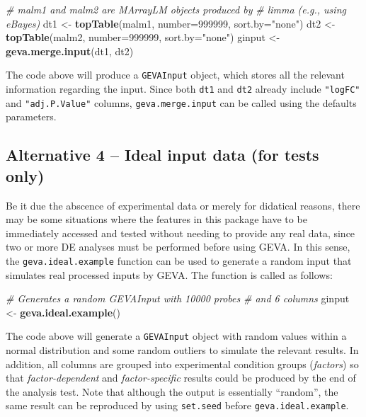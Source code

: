 \documentclass[
  12pt,
]{article}
\newenvironment{Shaded}{\begin{snugshade}}{\end{snugshade}}
\newcommand{\CommentTok}[1]{\textcolor[rgb]{0.56,0.35,0.01}{\textit{#1}}}
\newcommand{\DataTypeTok}[1]{\textcolor[rgb]{0.13,0.29,0.53}{#1}}
\newcommand{\DecValTok}[1]{\textcolor[rgb]{0.00,0.00,0.81}{#1}}
\newcommand{\KeywordTok}[1]{\textcolor[rgb]{0.13,0.29,0.53}{\textbf{#1}}}
\newcommand{\NormalTok}[1]{#1}
\newcommand{\StringTok}[1]{\textcolor[rgb]{0.31,0.60,0.02}{#1}}
\begin{document}
\begin{Shaded}
\begin{Highlighting}[]
\CommentTok{# malm1 and malm2 are MArrayLM objects produced by}
\CommentTok{# limma (e.g., using eBayes)}
\NormalTok{dt1 <-}\StringTok{ }\KeywordTok{topTable}\NormalTok{(malm1, }\DataTypeTok{number=}\DecValTok{999999}\NormalTok{, }\DataTypeTok{sort.by=}\StringTok{"none"}\NormalTok{)}
\NormalTok{dt2 <-}\StringTok{ }\KeywordTok{topTable}\NormalTok{(malm2, }\DataTypeTok{number=}\DecValTok{999999}\NormalTok{, }\DataTypeTok{sort.by=}\StringTok{"none"}\NormalTok{)}
\NormalTok{ginput <-}\StringTok{ }\KeywordTok{geva.merge.input}\NormalTok{(dt1, dt2)}
\end{Highlighting}
\end{Shaded}

The code above will produce a \texttt{GEVAInput} object, which stores
all the relevant information regarding the input. Since both
\texttt{dt1} and \texttt{dt2} already include \texttt{"logFC"} and
\texttt{"adj.P.Value"} columns, \texttt{geva.merge.input} can be called
using the defaults parameters.

\hypertarget{alternative-4-ideal-input-data-for-tests-only}{%
\subsection{Alternative 4 -- Ideal input data (for tests
only)}\label{alternative-4-ideal-input-data-for-tests-only}}

Be it due the abscence of experimental data or merely for didatical
reasons, there may be some situations where the features in this package
have to be immediately accessed and tested without needing to provide
any real data, since two or more DE analyses must be performed before
using GEVA. In this sense, the \texttt{geva.ideal.example} function can
be used to generate a random input that simulates real processed inputs
by GEVA. The function is called as follows:

\begin{Shaded}
\begin{Highlighting}[]
\CommentTok{# Generates a random GEVAInput with 10000 probes}
\CommentTok{# and 6 columns}
\NormalTok{ginput <-}\StringTok{ }\KeywordTok{geva.ideal.example}\NormalTok{()}
\end{Highlighting}
\end{Shaded}

The code above will generate a \texttt{GEVAInput} object with random
values within a normal distribution and some random outliers to simulate
the relevant results. In addition, all columns are grouped into
experimental condition groups (\emph{factors}) so that
\emph{factor-dependent} and \emph{factor-specific} results could be
produced by the end of the analysis test. Note that although the output
is essentially ``random'', the same result can be reproduced by using
\texttt{set.seed} before \texttt{geva.ideal.example}.
\end{document}
